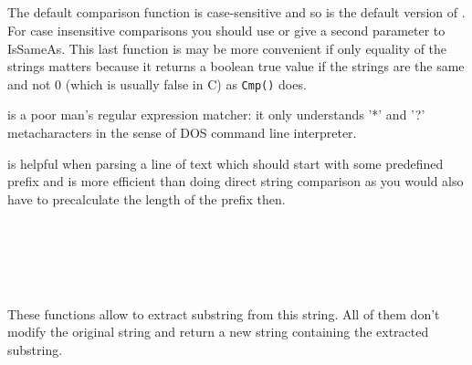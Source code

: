 \\
\\
\\
\\

\label{comparisoninwxstring}

The default comparison function  is case-sensitive and
so is the default version of . For case
insensitive comparisons you should use  or
give a second parameter to IsSameAs. This last function is may be more
convenient if only equality of the strings matters because it returns a boolean
true value if the strings are the same and not 0 (which is usually false in C)
as {\tt Cmp()} does.

 is a poor man's regular expression matcher:
it only understands '*' and '?' metacharacters in the sense of DOS command line
interpreter.

 is helpful when parsing a line of
text which should start with some predefined prefix and is more efficient than
doing direct string comparison as you would also have to precalculate the
length of the prefix then.

\\
\\
\\
\\

\label{substringextractioninwxstring}

These functions allow to extract substring from this string. All of them don't
modify the original string and return a new string containing the extracted
substring.

\\
\\
\\
\\
\\
\\
\\
\\

